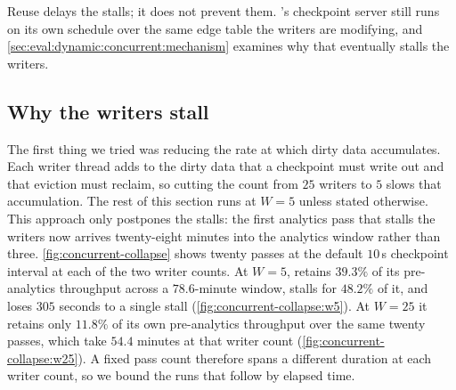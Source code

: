 Reuse delays the stalls; it does not prevent them.
\wt{}'s checkpoint server still runs on its own schedule over the same edge table the writers are modifying, and \autoref{sec:eval:dynamic:concurrent:mechanism} examines why that eventually stalls the writers.

\subsection{Why the writers stall}
\label{sec:eval:dynamic:concurrent:mechanism}

The first thing we tried was reducing the rate at which dirty data accumulates.
Each writer thread adds to the dirty data that a checkpoint must write out and that eviction must reclaim, so cutting the count from $25$ writers to $5$ slows that accumulation.
The rest of this section runs at $W=5$ unless stated otherwise.
This approach only postpones the stalls: the first analytics pass that stalls the writers now arrives twenty-eight minutes into the analytics window rather than three.
\autoref{fig:concurrent-collapse} shows twenty passes at the default $10$\,s checkpoint interval at each of the two writer counts.
At $W=5$, \project{} retains $39.3\%$ of its pre-analytics throughput across a $78.6$-minute window, stalls for $48.2\%$ of it, and loses $305$ seconds to a single stall (\autoref{fig:concurrent-collapse:w5}).
At $W=25$ it retains only $11.8\%$ of its own pre-analytics throughput over the same twenty passes, which take $54.4$ minutes at that writer count (\autoref{fig:concurrent-collapse:w25}).
A fixed pass count therefore spans a different duration at each writer count, so we bound the runs that follow by elapsed time.


